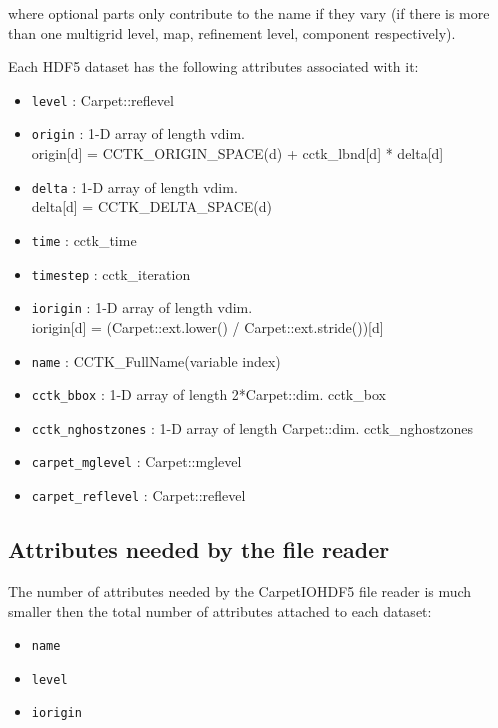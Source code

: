 \documentclass{article}
\begin{document}
where optional parts only contribute to the name if they vary (if there is
more than one multigrid level, map, refinement level, component respectively).

Each HDF5 dataset has the following attributes associated with it:

\begin{itemize}
  \item {\tt level} : Carpet::reflevel
  \item {\tt origin} : 1-D array of length vdim. \\
        origin[d] = CCTK\_ORIGIN\_SPACE(d) + cctk\_lbnd[d] * delta[d]
  \item {\tt delta} : 1-D array of length vdim. \\
        delta[d] = CCTK\_DELTA\_SPACE(d)
  \item {\tt time} : cctk\_time
  \item {\tt timestep} : cctk\_iteration
  \item {\tt iorigin} : 1-D array of length vdim. \\ iorigin[d] = (Carpet::ext.lower() / Carpet::ext.stride())[d]
  \item {\tt name} : CCTK\_FullName(variable index)
  \item {\tt cctk\_bbox} : 1-D array of length 2*Carpet::dim. cctk\_box
  \item {\tt cctk\_nghostzones} : 1-D array of length Carpet::dim. cctk\_nghostzones
  \item {\tt carpet\_mglevel} : Carpet::mglevel
  \item {\tt carpet\_reflevel} : Carpet::reflevel
\end{itemize}


\subsection{Attributes needed by the file reader}

The number of attributes needed by the CarpetIOHDF5 file reader is much smaller then the total
number of attributes attached to each dataset:

\begin{itemize}
  \item {\tt name}
  \item {\tt level}
  \item {\tt iorigin}
\end{itemize}

\fi


\end{document}
